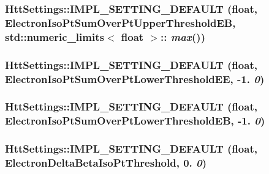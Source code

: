 \hypertarget{classHttSettings_a838490218671a3dcaf914069ac0f3fb7}{
\subsubsection[{IMPL\_\-SETTING\_\-DEFAULT}]{\setlength{\rightskip}{0pt plus 5cm}HttSettings::IMPL\_\-SETTING\_\-DEFAULT (float, \/  ElectronIsoPtSumOverPtUpperThresholdEB, \/  std::numeric\_\-limits$<$ float $>$:: {\em max}())}}
\label{classHttSettings_a838490218671a3dcaf914069ac0f3fb7}
\hypertarget{classHttSettings_a545431c13430b32a2546f166fb5887e1}{
\subsubsection[{IMPL\_\-SETTING\_\-DEFAULT}]{\setlength{\rightskip}{0pt plus 5cm}HttSettings::IMPL\_\-SETTING\_\-DEFAULT (float, \/  ElectronIsoPtSumOverPtLowerThresholdEE, \/  -\/1. {\em 0})}}
\label{classHttSettings_a545431c13430b32a2546f166fb5887e1}
\hypertarget{classHttSettings_a3cd331880ac0f66c6e9883957fef3337}{
\subsubsection[{IMPL\_\-SETTING\_\-DEFAULT}]{\setlength{\rightskip}{0pt plus 5cm}HttSettings::IMPL\_\-SETTING\_\-DEFAULT (float, \/  ElectronIsoPtSumOverPtLowerThresholdEB, \/  -\/1. {\em 0})}}
\label{classHttSettings_a3cd331880ac0f66c6e9883957fef3337}
\hypertarget{classHttSettings_a1515904af8a4c5d04f38bb8a4e115e6a}{
\subsubsection[{IMPL\_\-SETTING\_\-DEFAULT}]{\setlength{\rightskip}{0pt plus 5cm}HttSettings::IMPL\_\-SETTING\_\-DEFAULT (float, \/  ElectronDeltaBetaIsoPtThreshold, \/  0. {\em 0})}}

